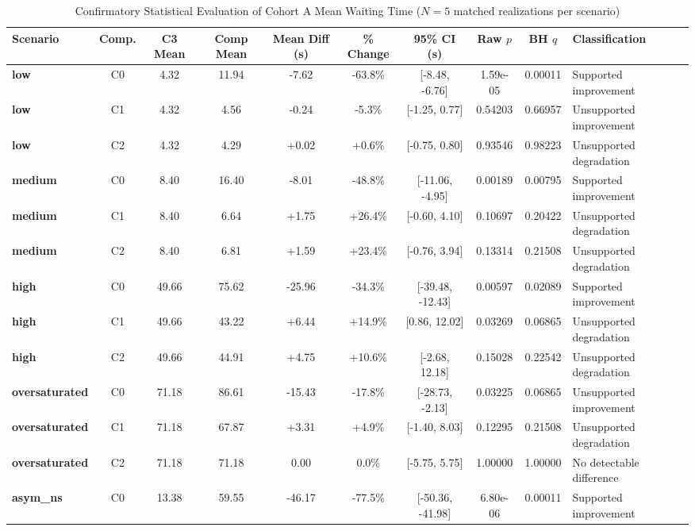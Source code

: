 \documentclass[11pt,journal,onecolumn]{article}
\begin{document}
\begin{table}[htbp]
\centering
\scriptsize
\caption{Confirmatory Statistical Evaluation of Cohort A Mean Waiting Time ($N=5$ matched realizations per scenario)}
\label{tab:primary_waiting_time}
\begin{tabularx}{\textwidth}{lccccccccX}
\toprule
\textbf{Scenario} & \textbf{Comp.} & \textbf{C3 Mean} & \textbf{Comp Mean} & \textbf{Mean Diff (s)} & \textbf{\% Change} & \textbf{95\% CI (s)} & \textbf{Raw $p$} & \textbf{BH $q$} & \textbf{Classification} \\
\midrule
\textbf{low} & C0 & 4.32 & 11.94 & -7.62 & -63.8\% & [-8.48, -6.76] & 1.59e-05 & 0.00011 & Supported improvement \\
\textbf{low} & C1 & 4.32 & 4.56 & -0.24 & -5.3\% & [-1.25, 0.77] & 0.54203 & 0.66957 & Unsupported improvement \\
\textbf{low} & C2 & 4.32 & 4.29 & +0.02 & +0.6\% & [-0.75, 0.80] & 0.93546 & 0.98223 & Unsupported degradation \\
\midrule
\textbf{medium} & C0 & 8.40 & 16.40 & -8.01 & -48.8\% & [-11.06, -4.95] & 0.00189 & 0.00795 & Supported improvement \\
\textbf{medium} & C1 & 8.40 & 6.64 & +1.75 & +26.4\% & [-0.60, 4.10] & 0.10697 & 0.20422 & Unsupported degradation \\
\textbf{medium} & C2 & 8.40 & 6.81 & +1.59 & +23.4\% & [-0.76, 3.94] & 0.13314 & 0.21508 & Unsupported degradation \\
\midrule
\textbf{high} & C0 & 49.66 & 75.62 & -25.96 & -34.3\% & [-39.48, -12.43] & 0.00597 & 0.02089 & Supported improvement \\
\textbf{high} & C1 & 49.66 & 43.22 & +6.44 & +14.9\% & [0.86, 12.02] & 0.03269 & 0.06865 & Unsupported degradation \\
\textbf{high} & C2 & 49.66 & 44.91 & +4.75 & +10.6\% & [-2.68, 12.18] & 0.15028 & 0.22542 & Unsupported degradation \\
\midrule
\textbf{oversaturated} & C0 & 71.18 & 86.61 & -15.43 & -17.8\% & [-28.73, -2.13] & 0.03225 & 0.06865 & Unsupported improvement \\
\textbf{oversaturated} & C1 & 71.18 & 67.87 & +3.31 & +4.9\% & [-1.40, 8.03] & 0.12295 & 0.21508 & Unsupported degradation \\
\textbf{oversaturated} & C2 & 71.18 & 71.18 & 0.00 & 0.0\% & [-5.75, 5.75] & 1.00000 & 1.00000 & No detectable difference \\
\midrule
\textbf{asym\_ns} & C0 & 13.38 & 59.55 & -46.17 & -77.5\% & [-50.36, -41.98] & 6.80e-06 & 0.00011 & Supported improvement \\

\end{tabularx}
\end{table}
\end{document}
